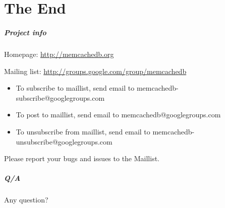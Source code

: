 \documentclass{beamer}
\newcommand{\mypart}[1]{\part{#1}\frame{\partpage \tableofcontents}}
\begin{document}
\mypart{The End}
\begin{frame}
\frametitle{Project info}
Homepage: \url{http://memcachedb.org}

Mailing list: \url{http://groups.google.com/group/memcachedb}
\begin{itemize}
\item To subscribe to maillist, send email to memcachedb-subscribe@googlegroups.com
\item To post to maillist, send email to memcachedb@googlegroups.com
\item To unsubscribe from maillist, send email to memcachedb-unsubscribe@googlegroups.com 
\end{itemize}

Please report your bugs and issues to the Maillist. 
\end{frame}

\begin{frame}
\frametitle{Q/A}
\begin{center}
Any question?
\end{center}
\end{frame}
\end{document}

